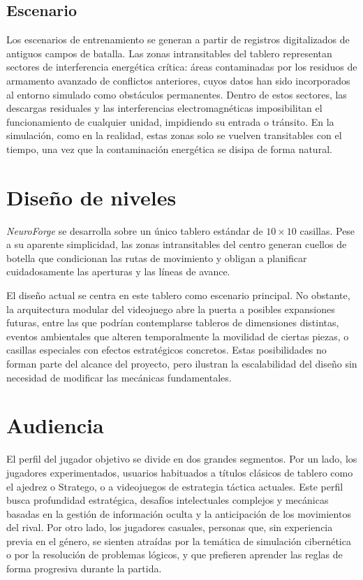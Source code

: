 \subsection{Escenario}

Los escenarios de entrenamiento se generan a partir de registros digitalizados de antiguos campos de batalla. Las zonas intransitables del tablero representan sectores de interferencia energética crítica: áreas contaminadas por los residuos de armamento avanzado de conflictos anteriores, cuyos datos han sido incorporados al entorno simulado como obstáculos permanentes. Dentro de estos sectores, las descargas residuales y las interferencias electromagnéticas imposibilitan el funcionamiento de cualquier unidad, impidiendo su entrada o tránsito. En la simulación, como en la realidad, estas zonas solo se vuelven transitables con el tiempo, una vez que la contaminación energética se disipa de forma natural.


\section{Diseño de niveles}

\textit{NeuroForge} se desarrolla sobre un único tablero estándar de $10 \times 10$ casillas. Pese a su aparente simplicidad, las zonas intransitables del centro generan cuellos de botella que condicionan las rutas de movimiento y obligan a planificar cuidadosamente las aperturas y las líneas de avance.

El diseño actual se centra en este tablero como escenario principal. No obstante, la arquitectura modular del videojuego abre la puerta a posibles expansiones futuras, entre las que podrían contemplarse tableros de dimensiones distintas, eventos ambientales que alteren temporalmente la movilidad de ciertas piezas, o casillas especiales con efectos estratégicos concretos. Estas posibilidades no forman parte del alcance del proyecto, pero ilustran la escalabilidad del diseño sin necesidad de modificar las mecánicas fundamentales.


\section{Audiencia}

El perfil del jugador objetivo se divide en dos grandes segmentos. Por un lado, los jugadores experimentados, usuarios habituados a títulos clásicos de tablero como el ajedrez o Stratego, o a videojuegos de estrategia táctica actuales. Este perfil busca profundidad estratégica, desafíos intelectuales complejos y mecánicas basadas en la gestión de información oculta y la anticipación de los movimientos del rival. Por otro lado, los jugadores casuales, personas que, sin experiencia previa en el género, se sienten atraídas por la temática de simulación cibernética o por la resolución de problemas lógicos, y que prefieren aprender las reglas de forma progresiva durante la partida. 

